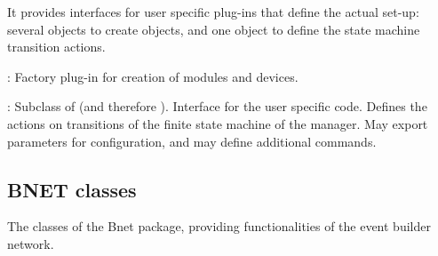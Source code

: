 \begin{description}
\begin{compactenum}
\begin{compactitem}[$\bullet$]
\end{compactitem}
      \item It provides interfaces for user specific plug-ins that define 
      the actual set-up: \\
      several  objects to create objects, and 
      one  object to define the state machine transition actions.
\end{compactenum}
\item[\class{dabc::Factory}] : 
	Factory plug-in for creation of modules and devices.
\item[\class{dabc::Application}] : 
Subclass of  
   (and therefore ). Interface for the user specific code. 
   Defines the actions on transitions of the finite state machine of the manager. 
   May export parameters for configuration, and may define additional commands.
\end{description}

\subsection{BNET classes}
\label{prog_bnet_classes}
The classes of the Bnet package, providing functionalities of the event builder network.

